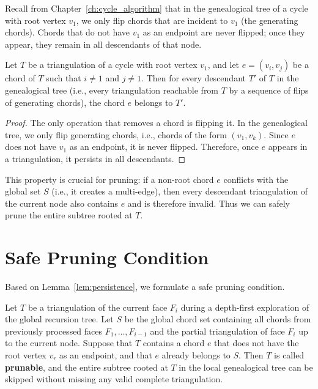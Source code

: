 Recall from Chapter~\ref{ch:cycle_algorithm} that in the genealogical tree of a cycle with root vertex \(v_1\), we only flip chords that are incident to \(v_1\) (the generating chords). 
Chords that do not have \(v_1\) as an endpoint are never flipped; once they appear, they remain in all descendants of that node.

\begin{lemma}
    \label{lem:persistence}
    Let \(T\) be a triangulation of a cycle with root vertex \(v_1\), and let \(e = (v_i, v_j)\) be a chord of \(T\) such that \(i \neq 1\) and \(j \neq 1\). 
    Then for every descendant \(T'\) of \(T\) in the genealogical tree (i.e., every triangulation reachable from \(T\) by a sequence of flips of generating chords), the chord \(e\) belongs to \(T'\).
\end{lemma}

\begin{proof}
    The only operation that removes a chord is flipping it. 
    In the genealogical tree, we only flip generating chords, i.e., chords of the form \((v_1, v_k)\). 
    Since \(e\) does not have \(v_1\) as an endpoint, it is never flipped. 
    Therefore, once \(e\) appears in a triangulation, it persists in all descendants.
\end{proof}

This property is crucial for pruning: if a non-root chord \(e\) conflicts with the global set \(S\) (i.e., it creates a multi-edge), then every descendant triangulation of the current node also contains \(e\) and is therefore invalid. 
Thus we can safely prune the entire subtree rooted at \(T\).

\section{Safe Pruning Condition}
\label{sec:safe_pruning}

Based on Lemma~\ref{lem:persistence}, we formulate a safe pruning condition.

\begin{definition}
    \label{def:prunable}
    Let \(T\) be a triangulation of the current face \(F_i\) during a depth-first exploration of the global recursion tree. 
    Let \(S\) be the global chord set containing all chords from previously processed faces \(F_1, \dots, F_{i-1}\) and the partial triangulation of face \(F_i\) up to the current node. 
    Suppose that \(T\) contains a chord \(e\) that does not have the root vertex \(v_r\) as an endpoint, and that \(e\) already belongs to \(S\). 
    Then \(T\) is called \textbf{prunable}, and the entire subtree rooted at \(T\) in the local genealogical tree can be skipped without missing any valid complete triangulation.
\end{definition}

